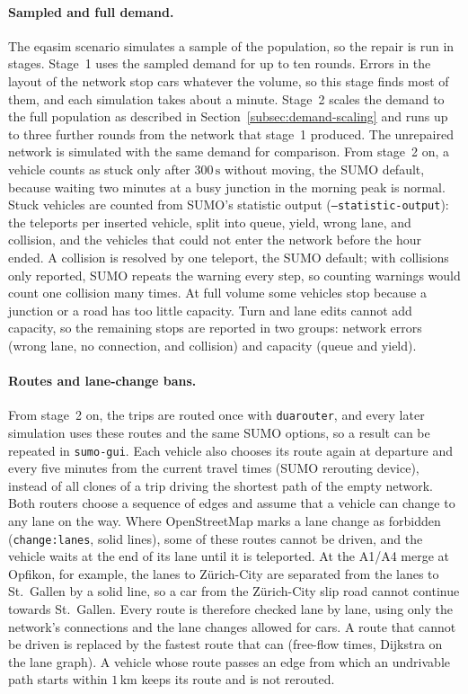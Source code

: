 \paragraph{Sampled and full demand.} The eqasim scenario simulates a
sample of the population, so the repair is run in stages. Stage~1 uses
the sampled demand for up to ten rounds. Errors in the layout of the
network stop cars whatever the volume, so this stage finds most of
them, and each simulation takes about a minute. Stage~2 scales the
demand to the full population as described in
Section~\ref{subsec:demand-scaling} and runs up to three further rounds
from the network that stage~1 produced. The unrepaired network is
simulated with the same demand for comparison. From stage~2 on, a
vehicle counts as stuck only after \(300\,\mathrm{s}\) without moving,
the SUMO default, because waiting two minutes at a busy junction in the
morning peak is normal. Stuck vehicles are counted from SUMO's
statistic output (\texttt{--statistic-output}): the teleports per
inserted vehicle, split into queue, yield, wrong lane, and collision,
and the vehicles that could not enter the network before the hour
ended. A collision is resolved by one teleport, the SUMO default; with
collisions only reported, SUMO repeats the warning every step, so
counting warnings would count one collision many times. At full volume
some vehicles stop because a junction or a road has too little
capacity. Turn and lane edits cannot add capacity, so the remaining
stops are reported in two groups: network errors (wrong lane, no
connection, and collision) and capacity (queue and yield).

\paragraph{Routes and lane-change bans.} From stage~2 on, the trips are
routed once with \texttt{duarouter}, and every later simulation uses
these routes and the same SUMO options, so a result can be repeated in
\texttt{sumo-gui}. Each vehicle also chooses its route again at
departure and every five minutes from the current travel times (SUMO
rerouting device), instead of all clones of a trip driving the
shortest path of the empty network. Both routers choose a sequence of
edges and assume that a vehicle can change to any lane on the way.
Where OpenStreetMap marks a lane change as forbidden
(\texttt{change:lanes}, solid lines), some of these routes cannot be
driven, and the vehicle waits at the end of its lane until it is
teleported. At the A1/A4 merge at Opfikon, for example, the lanes to
Zürich-City are separated from the lanes to St.~Gallen by a solid line,
so a car from the Zürich-City slip road cannot continue towards
St.~Gallen. Every route is therefore checked lane by lane, using only
the network's connections and the lane changes allowed for cars. A
route that cannot be driven is replaced by the fastest route that can
(free-flow times, Dijkstra on the lane graph). A vehicle whose route
passes an edge from which an undrivable path starts within
\(1\,\mathrm{km}\) keeps its route and is not rerouted.

